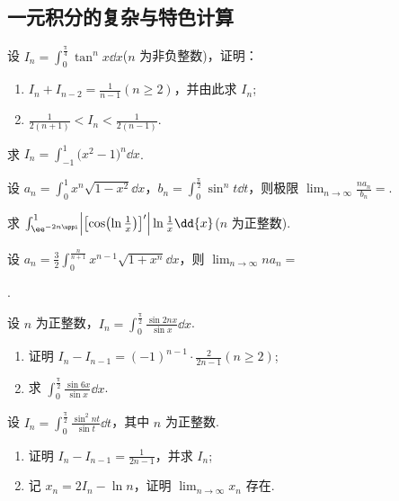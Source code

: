\subsection{一元积分的复杂与特色计算}

	\begin{ti}
		设 $I_{n} = \int_{0}^{\frac{\uppi}{4}} \tan^{n}x \dd{x}$($n$ 为非负整数)，证明：
		\begin{enumerate}
			\item $I_{n} + I_{n-2} = \frac{1}{n - 1} (n \geq 2)$，并由此求 $I_{n}$;
			\item $\frac{1}{2(n + 1)} < I_{n} < \frac{1}{2(n - 1)}$.
		\end{enumerate}
	\end{ti}

	\begin{ti}
		求 $I_{n} = \int_{-1}^{1} \bigl( x^{2} - 1 \bigr)^{n} \dd{x}$.
	\end{ti}

	\begin{ti}
		设 $a_{n} = \int_{0}^{1} x^{n} \sqrt{1 - x^{2}} \dd{x}$，$b_{n} = \int_{0}^{\frac{\uppi}{2}} \sin^{n}t \dd{t}$，则极限 $\lim_{n \to \infty} \frac{n a_{n}}{b_{n}} = $\kuo.

	\end{ti}

	\begin{ti}
		求 $\int_{\ee^{-2 n \uppi}}^{1} \Bigl| \bigl[ \cos \bigl( \ln \frac{1}{x} \bigr) \bigr]' \Bigr| \ln \frac{1}{x} \dd{x}$($n$ 为正整数).
	\end{ti}

	\begin{ti}
		设 $a_{n} = \frac{3}{2} \int_{0}^{\frac{n}{n + 1}} x^{n-1} \sqrt{1 + x^{n}} \dd{x}$，则 $\lim_{n \to \infty} n a_{n} = $
		
		\noindent\htwo.
	\end{ti}

	\begin{ti}
		设 $n$ 为正整数，$I_{n} = \int_{0}^{\frac{\uppi}{2}} \frac{\sin 2nx}{\sin x} \dd{x}$.
		\begin{enumerate}
			\item 证明 $I_{n} - I_{n-1} = (-1)^{n-1} \cdot \frac{2}{2n-1} (n \geq 2)$;
			\item 求 $\int_{0}^{\frac{\uppi}{2}} \frac{\sin 6x}{\sin x} \dd{x}$.
		\end{enumerate}
	\end{ti}

	\begin{ti}
		设 $I_{n} = \int_{0}^{\frac{\uppi}{2}} \frac{\sin^{2}nt}{\sin t} \dd{t}$，其中 $n$ 为正整数.
		\begin{enumerate}
			\item 证明 $I_{n} - I_{n-1} = \frac{1}{2n-1}$，并求 $I_{n}$;
			\item 记 $x_{n} = 2I_{n} - \ln n$，证明 $\lim_{n \to \infty} x_{n}$ 存在.
		\end{enumerate}
	\end{ti}


